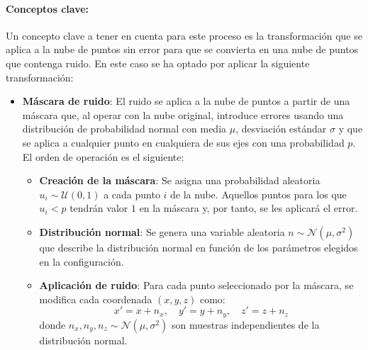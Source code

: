 \documentclass[12pt, a4paper, twoside]{article}
\begin{document}
\paragraph{Conceptos clave:} 
Un concepto clave a tener en cuenta para este proceso es la transformación que se aplica a la nube de puntos sin error para que se convierta en una nube de 
puntos que contenga ruido. En este caso se ha optado por aplicar la siguiente transformación:
\begin{itemize}
  \item \textbf{Máscara de ruido}: El ruido se aplica a la nube de puntos a partir de una máscara que, al operar con la nube original, introduce errores 
  usando una distribución de probabilidad normal con media $\mu$, desviación estándar $\sigma$ y que se aplica a cualquier punto en cualquiera de sus ejes 
  con una probabilidad $p$. El orden de operación es el siguiente:
  \begin{itemize}
      \item \textbf{Creación de la máscara}: Se asigna una probabilidad aleatoria $u_i \sim \mathcal{U}(0,1)$ a cada punto $i$ de la nube.  
      Aquellos puntos para los que $u_i < p$ tendrán valor $1$ en la máscara y, por tanto, se les aplicará el error.
      
      \item \textbf{Distribución normal}: Se genera una variable aleatoria $n \sim \mathcal{N}(\mu, \sigma^2)$ que describe la distribución normal en 
      función de los parámetros elegidos en la configuración.
      
      \item \textbf{Aplicación de ruido}: Para cada punto seleccionado por la máscara, se modifica cada coordenada $(x, y, z)$ como:
      \[
      x' = x + n_x, \quad y' = y + n_y, \quad z' = z + n_z
      \]
      donde $n_x, n_y, n_z \sim \mathcal{N}(\mu, \sigma^2)$ son muestras independientes de la distribución normal.
  \end{itemize}
\end{itemize}
\end{document}
